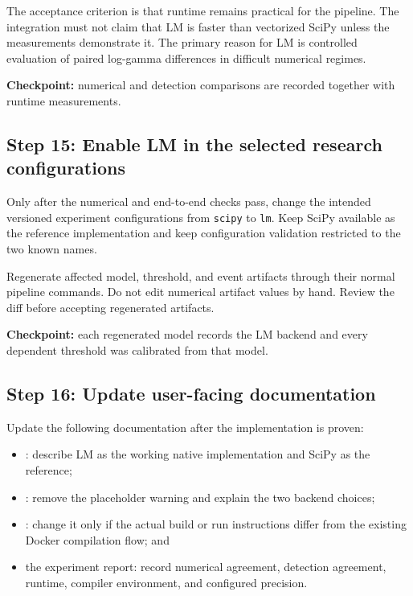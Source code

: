 \documentclass[11pt,a4paper]{article}
\begin{document}
The acceptance criterion is that runtime remains practical for the pipeline.
The integration must not claim that LM is faster than vectorized SciPy unless
the measurements demonstrate it. The primary reason for LM is controlled
evaluation of paired log-gamma differences in difficult numerical regimes.

\textbf{Checkpoint:} numerical and detection comparisons are recorded together
with runtime measurements.

\subsection{Step 15: Enable LM in the selected research configurations}

Only after the numerical and end-to-end checks pass, change the intended
versioned experiment configurations from \texttt{scipy} to \texttt{lm}. Keep
SciPy available as the reference implementation and keep configuration
validation restricted to the two known names.

Regenerate affected model, threshold, and event artifacts through their normal
pipeline commands. Do not edit numerical artifact values by hand. Review the
diff before accepting regenerated artifacts.

\textbf{Checkpoint:} each regenerated model records the LM backend and every
dependent threshold was calibrated from that model.

\subsection{Step 16: Update user-facing documentation}

Update the following documentation after the implementation is proven:

\begin{itemize}

\item {}: describe LM as the working native
implementation and SciPy as the reference;

\item {}: remove the placeholder warning and explain
the two backend choices;

\item {}: change it only if the actual build or run instructions
differ from the existing Docker compilation flow; and

\item the experiment report: record numerical agreement, detection agreement,
runtime, compiler environment, and configured precision.

\end{itemize}
\end{document}
